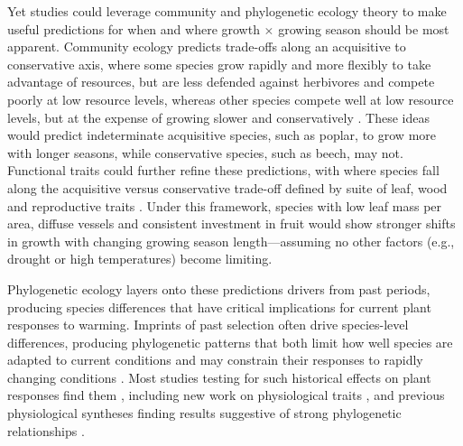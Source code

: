 \documentclass[11pt]{article}
\begin{document}
Yet studies could leverage community and phylogenetic ecology theory to make useful predictions for when and where growth $\times$ growing season should be most apparent. Community ecology predicts trade-offs along an acquisitive to conservative axis, where some species grow rapidly and more flexibly to take advantage of resources, but are less defended against herbivores and compete poorly at low resource levels, whereas other species compete well at low resource levels, but at the expense of growing slower and conservatively \citep[][]{Grime:1977sw}. These ideas would predict indeterminate acquisitive species, such as poplar, to grow more with longer seasons, while conservative species, such as beech, may not. Functional traits could further refine these predictions, with where species fall along the acquisitive versus conservative trade-off defined by suite of leaf, wood and reproductive traits \citep[][]{diaz2016}. Under this framework, species with low leaf mass per area, diffuse vessels and consistent investment in fruit would show stronger shifts in growth with changing growing season length---assuming no other factors (e.g., drought or high temperatures) become limiting.

Phylogenetic ecology layers onto these predictions drivers from past periods, producing species differences that have critical implications for current plant responses to warming. Imprints of past selection often drive species-level differences, producing phylogenetic patterns that both limit how well species are adapted to current conditions and may constrain their responses to rapidly changing conditions \citep{Ackerly:2009ly}.  %
Most studies testing for such historical effects on plant responses find them \citep[e.g.,][]{phenophylo}, including new work on physiological traits \citep{avila2023evidence}, and previous physiological syntheses finding results suggestive of strong phylogenetic relationships \citep[e.g.,][]{way2010differential}.
\end{document}
